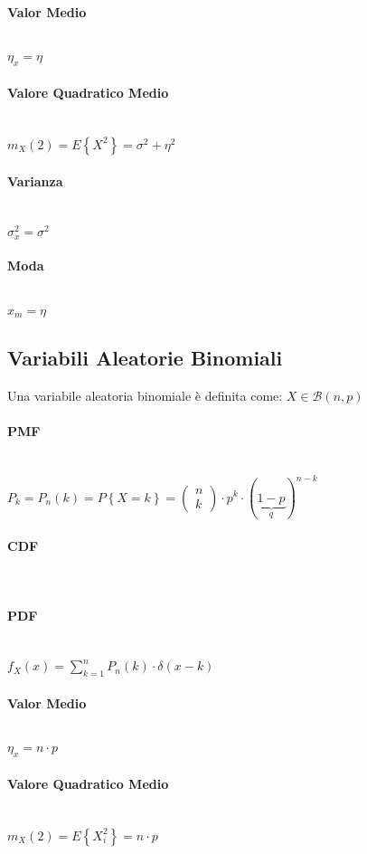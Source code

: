 \documentclass{article}
\begin{document}
\paragraph{Valor Medio} ~\\
$\eta_x = \eta$
\paragraph{Valore Quadratico Medio} ~\\
$m_X(2) = E \left\{ X^2 \right\} = \sigma^2 + \eta^2$
\paragraph{Varianza} ~\\
$\sigma_x^2 = \sigma^2$
\paragraph{Moda} ~\\
$x_m = \eta $

\subsection{Variabili Aleatorie Binomiali}
Una variabile aleatoria binomiale è definita come: $X \in \mathcal{B}(n,p)$
\paragraph{PMF} ~\\
$P_k = P_n(k)= P \left\{X = k \right\} = \begin{pmatrix} n \\ k \end{pmatrix} \cdot p^k \cdot (\underset{q}{\underbrace{1-p}})^{n-k}$
\paragraph{CDF} ~\\
\paragraph{PDF} ~\\
$f_X(x) = \sum_{k=1}^{n} P_n(k) \cdot \delta(x-k)$
\paragraph{Valor Medio} ~\\
$\eta_x = n \cdot p $
\paragraph{Valore Quadratico Medio} ~\\
$m_X(2) = E \left\{ X_i^2 \right\} = n \cdot p$
\end{document}
